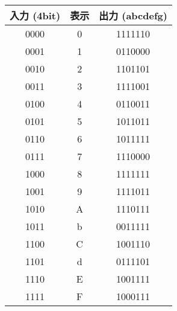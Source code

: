 \documentclass{article}
\begin{document}
\begin{center}
\begin{tabular}{|c|c|c|}
\hline
入力 (4bit) & 表示 & 出力 (abcdefg) \\
\hline
0000 & 0 & 1111110 \\
0001 & 1 & 0110000 \\
0010 & 2 & 1101101 \\
0011 & 3 & 1111001 \\
0100 & 4 & 0110011 \\
0101 & 5 & 1011011 \\
0110 & 6 & 1011111 \\
0111 & 7 & 1110000 \\
1000 & 8 & 1111111 \\
1001 & 9 & 1111011 \\
1010 & A & 1110111 \\
1011 & b & 0011111 \\
1100 & C & 1001110 \\
1101 & d & 0111101 \\
1110 & E & 1001111 \\
1111 & F & 1000111 \\
\hline
\end{tabular}
\end{center}
\end{document}
